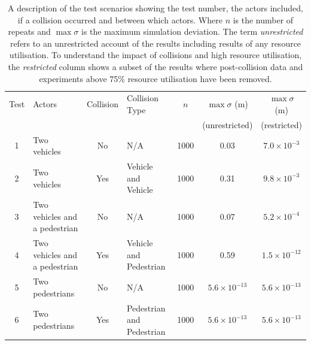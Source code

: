 \documentclass[letterpaper, 10 pt, journal, twoside]{IEEEtran}
\begin{document}
%
%

\begin{table}[b]
\centering
\begin{tabular}{clclccc}
\toprule
Test & Actors 					 	  & Collision 	 & Collision Type 			 & $n$  & $\max\sigma$ (m) & $\max\sigma$ (m) \\ 
	 & 								  & 			 & 							 &	    & (unrestricted)  & (restricted)	\\ \midrule
1    & Two vehicles                   & No  		 & N/A 			  			 & 1000 & 0.03 & $7.0{\times}10^{-3}$ \\
2    & Two vehicles                   & Yes 		 & Vehicle and Vehicle 		 & 1000 & 0.31 & $9.8{\times}10^{-3}$ \\
3    & Two vehicles and a pedestrian  & No  		 & N/A 			  			 & 1000 & 0.07 & $5.2{\times}10^{-4}$ \\
4    & Two vehicles and a pedestrian  & Yes 		 & Vehicle and Pedestrian 	 & 1000 & 0.59 & $1.5{\times}10^{-12}$ \\
5    & Two pedestrians                & No  		 & N/A 			  			 & 1000 & $5.6{\times}10^{-13}$ & $5.6{\times}10^{-13}$ \\
6    & Two pedestrians                & Yes 		 & Pedestrian and Pedestrian & 1000 & $5.6{\times}10^{-13}$ & $5.6{\times}10^{-13}$ \\
\bottomrule
\end{tabular}
\caption{A description of the test scenarios showing the test number, the actors included, if a collision occurred and between which actors. Where $n$ is the number of repeats and $\max\sigma$ is the maximum simulation deviation. The term \textit{unrestricted} refers to an unrestricted account of the results including results of any resource utilisation. To understand the impact of collisions and high resource utilisation, the \textit{restricted} column shows a subset of the results where post-collision data and experiments above 75\% resource utilisation have been removed.}
\label{TableOfExperiments}
\end{table}
\end{document}
